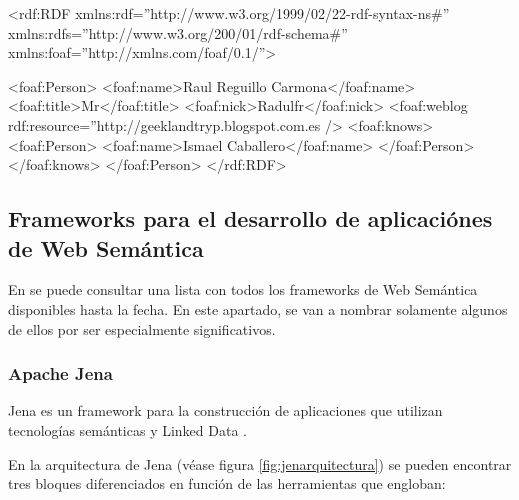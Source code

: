 \begin{listing}[
    float=ht,
    language = XML, 
    numbers=left,
    numberstyle=\tiny,
    stepnumber=1,
    numbersep=5pt,
    frame=single,
    caption = {Ejemplo de \acs{FOAF}}, 
    label = code:foaf]
<rdf:RDF
  xmlns:rdf=''http://www.w3.org/1999/02/22-rdf-syntax-ns#''
  xmlns:rdfs=''http://www.w3.org/200/01/rdf-schema#''
  xmlns:foaf=''http://xmlns.com/foaf/0.1/''>

  <foaf:Person>
    <foaf:name>Raul Reguillo Carmona</foaf:name>
    <foaf:title>Mr</foaf:title>
    <foaf:nick>Radulfr</foaf:nick>
    <foaf:weblog rdf:resource=''http://geeklandtryp.blogspot.com.es />
    <foaf:knows>
      <foaf:Person>
        <foaf:name>Ismael Caballero</foaf:name>
      </foaf:Person>
    </foaf:knows>
  </foaf:Person>
</rdf:RDF>

\end{listing}

\subsection{Frameworks para el desarrollo de aplicaciónes de Web Semántica}

En \cite{W3CTools} se puede consultar una lista con todos los frameworks de Web
Semántica disponibles hasta la fecha. En este apartado, se van a nombrar
solamente algunos de ellos por ser especialmente significativos. 

\subsubsection{Apache Jena}
\label{sec:eajena}

Jena es un framework para la construcción de aplicaciones que utilizan
tecnologías semánticas y Linked Data \cite{JENA}. 

En la arquitectura de Jena (véase figura \ref{fig:jenarquitectura}) se pueden encontrar tres bloques diferenciados en función de
las herramientas que engloban: 


